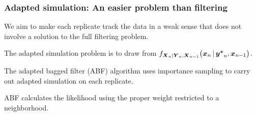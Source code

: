 \documentclass{beamer}
\begin{document}
\begin{frame}
  \frametitle{Adapted simulation: An easier problem than filtering}

  \begin{myitemize}
  \item
    We aim to make each replicate track the data in a weak sense that does not involve a solution to the full filtering problem.

\vspace{3mm}

  \item
    The adapted simulation problem is to draw from
$f_{\boldsymbol{X}_{n}|\boldsymbol{Y}_{n},\boldsymbol{X}_{n-1}}
  \big(
    \boldsymbol{x}_{n}{\,\vert\,} \boldsymbol{y^*}_{n},\boldsymbol{x}_{n-1}
  \big)$.

\vspace{3mm}

  \item The adapted bagged filter (ABF) algorithm uses importance sampling to carry out adapted simulation on each replicate.


\vspace{3mm}

    \item ABF calculates the likelihood using the proper weight restricted to a neighborhood.
\end{myitemize}
    
\end{frame}
\end{document}
